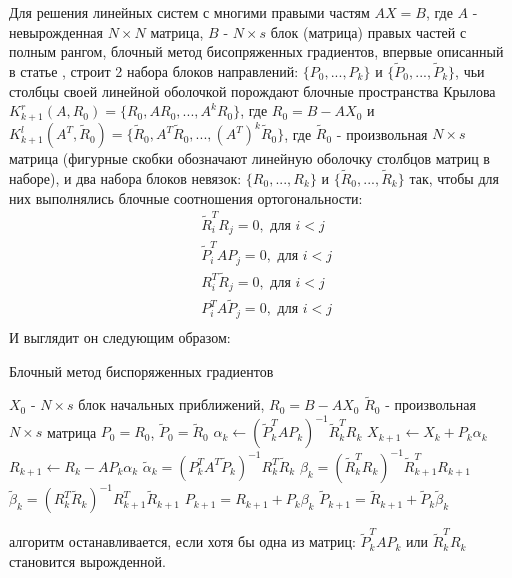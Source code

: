 Для решения линейных систем с многими правыми частям $AX=B$, где $A$ - невырожденная $N \times N$ матрица,
$B$ - $N \times s$ блок (матрица) правых частей с полным рангом,  
блочный метод бисопряженных градиентов, впервые описанный в статье \cite{OLEARY1980293}, строит 2 набора блоков направлений:
$\{ P_0, ... , P_k \}$ и $\{ \tilde{P}_0, ... , \tilde{P}_k \}$, чьи столбцы своей линейной оболочкой
порождают блочные пространства Крылова $K^r_{k+1}(A,R_0) = \{R_0,A R_0, ... ,A^k R_0\}$, где $R_0 = B - A X_0$ и
 $K^l_{k+1}(A^T,\tilde{R}_0) = \{\tilde{R}_0,A^T \tilde{R}_0, ... ,(A^T)^k \tilde{R}_0\}$, где $\tilde{R}_0$ - 
 произвольная $N \times s$ матрица (фигурные скобки обозначают линейную оболочку столбцов матриц в наборе), 
и два набора блоков невязок: $\{R_0, ... , R_k\}$ и $\{\tilde{R}_0, ... , \tilde{R}_k\}$ так, чтобы для них выполнялись 
блочные соотношения ортогональности:
\begin{align}
    &\tilde{R}_i^T R_j = 0, \text{ для } i < j \label{eq:bbcgorth1}\\
    &\tilde{P}_i^T A P_j = 0, \text{ для } i < j \label{eq:bbcgorth2}\\
    &R_i^T \tilde{R}_j = 0, \text{ для } i < j \label{eq:bbcgorth3}\\
    &P_i^T A \tilde{P}_j = 0, \text{ для } i < j \label{eq:bbcgorth4}\\
\end{align}
И выглядит он следующим образом:
\begin{algorithm}[H]
    \caption{Блочный метод биспоряженных градиентов}
    \begin{algorithmic}
        \State $X_0$ - $N \times s$ блок начальных приближений, $R_0 = B - AX_0$
        \State $\tilde{R}_0$ - произвольная $ N\times s $ матрица
        \State $P_0 = R_0$, $\tilde{P}_0 = \tilde{R}_0$
            \State $\alpha_k \gets (\tilde{P}_k^T A P_k)^{-1} \tilde{R}_k^T R_k$
            \State $X_{k+1} \gets X_k + P_k \alpha_k$
            \State $R_{k+1} \gets R_k - A P_k \alpha_k$
            \State $\tilde{\alpha}_k = (P_k^TA^T \tilde{P}_k)^{-1}R_k^T \tilde{R}_k$
            \State $\beta_k = (\tilde{R}_k^T R_k)^{-1} \tilde{R}_{k+1}^T R_{k+1}$
            \State $\tilde{\beta}_k = (R_k^T \tilde{R}_k)^{-1} R_{k+1}^T \tilde{R}_{k+1}$
            \State $P_{k+1} = R_{k+1} + P_k \beta_k$
            \State $\tilde{P}_{k+1} = \tilde{R}_{k+1} + \tilde{P}_k \tilde{\beta}_k$
        \EndFor 
    \end{algorithmic}
\end{algorithm}
алгоритм останавливается, если хотя бы одна из матриц: $\tilde{P}_k^T A P_k$ или $\tilde{R}_k^T R_k$ становится 
вырожденной. 

